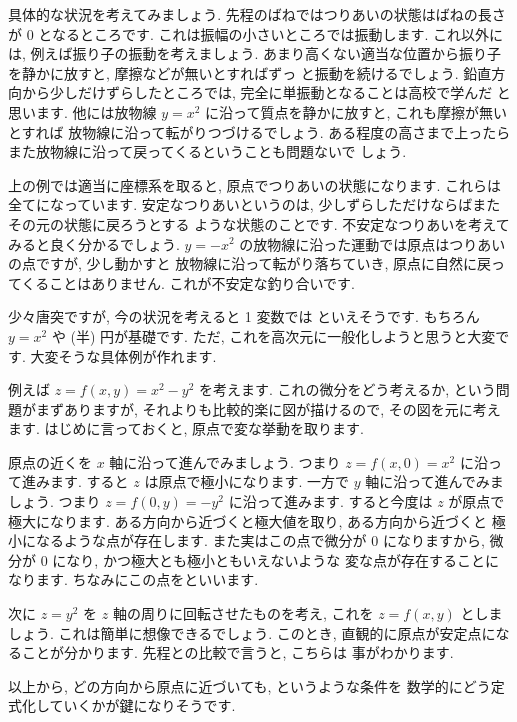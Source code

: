 \documentclass[openany, a4paper, oneside]{jsbook}
\theoremstyle{break}
\theoremstyle{breakdefn}
\begin{document}
具体的な状況を考えてみましょう.
先程のばねではつりあいの状態はばねの長さが 0 となるところです.
これは振幅の小さいところでは振動します.
これ以外には, 例えば振り子の振動を考えましょう.
あまり高くない適当な位置から振り子を静かに放すと, 摩擦などが無いとすればずっ
と振動を続けるでしょう.
鉛直方向から少しだけずらしたところでは, 完全に単振動となることは高校で学んだ
と思います.
他には放物線 $y=x^2$ に沿って質点を静かに放すと, これも摩擦が無いとすれば
放物線に沿って転がりつづけるでしょう.
ある程度の高さまで上ったらまた放物線に沿って戻ってくるということも問題ないで
しょう.

上の例では適当に座標系を取ると, 原点でつりあいの状態になります.
これらは全てになっています.
安定なつりあいというのは, 少しずらしただけならばまたその元の状態に戻ろうとする
ような状態のことです.
不安定なつりあいを考えてみると良く分かるでしょう.
 $y=-x^2$ の放物線に沿った運動では原点はつりあいの点ですが, 少し動かすと
放物線に沿って転がり落ちていき, 原点に自然に戻ってくることはありません.
これが不安定な釣り合いです.

少々唐突ですが, 今の状況を考えると 1 変数では
といえそうです. もちろん $y=x^2$ や (半) 円が基礎です.
ただ, これを高次元に一般化しようと思うと大変です.
大変そうな具体例が作れます.

例えば $z=f (x,y)=x^2-y^2$ を考えます.
これの微分をどう考えるか, という問題がまずありますが,
それよりも比較的楽に図が描けるので, その図を元に考えます.
はじめに言っておくと, 原点で変な挙動を取ります.

原点の近くを $x$ 軸に沿って進んでみましょう.
つまり $z=f (x,0)=x^2$ に沿って進みます.
すると $z$ は原点で極小になります.
一方で $y$ 軸に沿って進んでみましょう.
つまり $z=f (0,y)=-y^2$ に沿って進みます.
すると今度は $z$ が原点で極大になります.
ある方向から近づくと極大値を取り, ある方向から近づくと
極小になるような点が存在します.
また実はこの点で微分が 0 になりますから,
微分が 0 になり, かつ極大とも極小ともいえないような
変な点が存在することになります.
ちなみにこの点をといいます.

次に $z=y^2$ を $z$ 軸の周りに回転させたものを考え,
これを $z=f (x,y)$ としましょう.
これは簡単に想像できるでしょう.
このとき, 直観的に原点が安定点になることが分かります.
先程との比較で言うと, こちらは
事がわかります.

以上から, どの方向から原点に近づいても, というような条件を
数学的にどう定式化していくかが鍵になりそうです.
\end{document}
